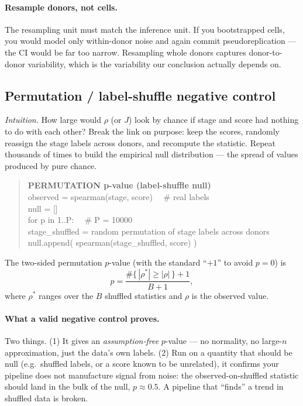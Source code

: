 \documentclass[11pt]{article}
\begin{document}
\paragraph{Resample donors, not cells.} The resampling unit must match the inference unit. If you bootstrapped cells, you would model only within-donor noise and again commit pseudoreplication --- the CI would be far too narrow. Resampling whole donors captures donor-to-donor variability, which is the variability our conclusion actually depends on.

\subsection{Permutation / label-shuffle negative control}\label{sec:perm}

\textit{Intuition.} How large would $\rho$ (or $J$) look by chance if stage and score had nothing to do with each other? Break the link on purpose: keep the scores, randomly reassign the stage labels across donors, and recompute the statistic. Repeat thousands of times to build the empirical null distribution --- the spread of values produced by pure chance.

\begin{quote}
\ttfamily
\textbf{PERMUTATION p-value (label-shuffle null)}\\
observed = spearman(stage, score) \ \ \# real labels\\
null = []\\
for p in 1..P: \ \ \# P = 10000\\
\hspace*{2em}stage\_shuffled = random permutation of stage labels across donors\\
\hspace*{2em}null.append( spearman(stage\_shuffled, score) )
\end{quote}

The two-sided permutation $p$-value (with the standard ``$+1$'' to avoid $p=0$) is
\[
p = \frac{\#\{\, |\rho^*| \ge |\rho| \,\} + 1}{B + 1},
\]
where $\rho^*$ ranges over the $B$ shuffled statistics and $\rho$ is the observed value.

\paragraph{What a valid negative control proves.} Two things. (1) It gives an \emph{assumption-free} $p$-value --- no normality, no large-$n$ approximation, just the data's own labels. (2) Run on a quantity that should be null (e.g.\ shuffled labels, or a score known to be unrelated), it confirms your pipeline does not manufacture signal from noise: the observed-on-shuffled statistic should land in the bulk of the null, $p \approx 0.5$. A pipeline that ``finds'' a trend in shuffled data is broken.
\end{document}
